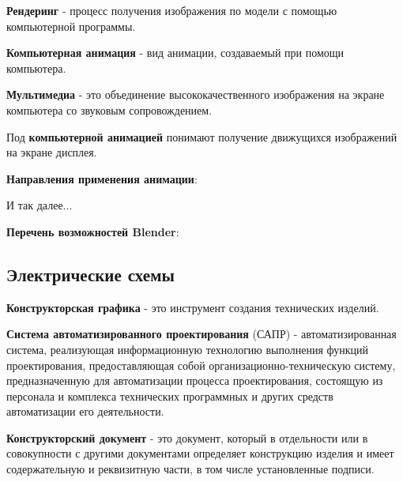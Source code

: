 \documentclass{article}
\begin{document}
\begin{flushleft}
\textbf{Рендеринг} - процесс получения изображения по модели с помощью компьютерной программы.

\hfill

\textbf{Компьютерная анимация} - вид анимации, создаваемый при помощи компьютера.

\textbf{Мультимедиа} - это объединение высококачественного изображения на экране компьютера со звуковым сопровождением.

Под \textbf{компьютерной анимацией} понимают получение движущихся изображений на экране дисплея.

\hfill

\textbf{Направления применения анимации}:

\begin{multienumerate}
    \begin{center}
        И так далее...
    \end{center}
\end{multienumerate}

\textbf{Перечень возможностей Blender}:

\begin{multienumerate}
\end{multienumerate}

\subsection{Электрические схемы}

\textbf{Конструкторская графика} - это инструмент создания технических изделий.

\hfill

\textbf{Система автоматизированного проектирования} (САПР) - автоматизированная система, реализующая информационную технологию выполнения функций проектирования, предоставляющая собой организационно-техническую систему, предназначенную для автоматизации процесса проектирования, состоящую из персонала и комплекса технических программных и других средств автоматизации его деятельности.

\hfill

\textbf{Конструкторский документ} - это документ, который в отдельности или в совокупности с другими документами определяет конструкцию изделия и имеет содержательную и реквизитную части, в том числе установленные подписи.


\end{flushleft}
\end{document}
